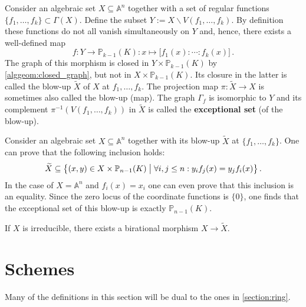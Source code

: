     \begin{construct}[Blow-up]
        Consider an algebraic set $X\subseteq\mathbb{A}^n$ together with a set of regular functions $\{f_1,\ldots,f_k\}\subset\Gamma(X)$. Define the subset $Y:=X\backslash V(f_1,\ldots,f_k)$. By definition these functions do not all vanish simultaneously on $Y$ and, hence, there exists a well-defined map \[f:Y\rightarrow \mathbb{P}_{k-1}(K):x\mapsto\bigl[f_1(x):\cdots:f_k(x)\bigr]\,.\] The graph of this morphism is closed in $Y\times\mathbb{P}_{k-1}(K)$ by \cref{alggeom:closed_graph}, but not in $X\times\mathbb{P}_{k-1}(K)$. Its closure in the latter is called the blow-up $\widetilde{X}$ of $X$ at $f_1,\ldots,f_k$. The projection map $\pi:\widetilde{X}\rightarrow X$ is sometimes also called the blow-up (map). The graph $\Gamma_f$ is isomorphic to $Y$ and its complement $\pi^{-1}(V(f_1,\ldots,f_k))$ in $\widetilde{X}$ is called the \textbf{exceptional set} (of the blow-up).
    \end{construct}

    \begin{construct}
        Consider an algebraic set $X\subseteq\mathbb{A}^n$ together with its blow-up $\widetilde{X}$ at $\{f_1,\ldots,f_k\}$. One can prove that the following inclusion holds:
        \begin{gather}
            \widetilde{X}\subseteq\bigl\{(x,y)\in X\times\mathbb{P}_{n-1}(K)\bigm\vert\forall i,j\leq n:y_if_j(x)=y_jf_i(x)\bigr\}\,.
        \end{gather}
        In the case of $X=\mathbb{A}^n$ and $f_i(x)=x_i$ one can even prove that this inclusion is an equality. Since the zero locus of the coordinate functions is $\{0\}$, one finds that the exceptional set of this blow-up is exactly $\mathbb{P}_{n-1}(K)$.
    \end{construct}

    \begin{property}
        If $X$ is irreducible, there exists a birational morphism $X\rightarrow\widetilde{X}$.
    \end{property}

\section{Schemes}\label{section:schemes}

    Many of the definitions in this section will be dual to the ones in \cref{section:ring}.

